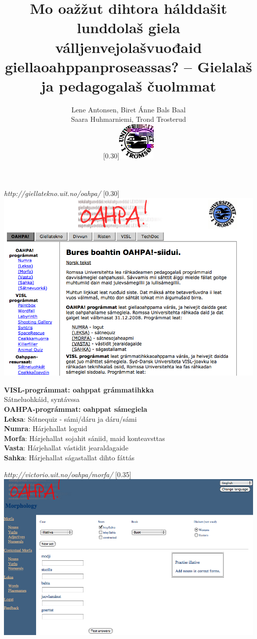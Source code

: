 \documentclass[landscape,norsk,11pt]{seminar}
\title{Mo oažžut dihtora hálddašit lunddolaš giela válljenvejolašvuođaid giellaoahppanproseassas? -- Gielalaš ja pedagogalaš čuolmmat}
\author{Lene Antonsen, Biret Ánne Bals Baal\\
Saara Huhmarniemi, Trond Trosterud \\
 \scalebox{0.30}[0.30]{\includegraphics{img/logoWeb070sh.jpg}}}
\begin{document}
\begin{slide}

\maketitle


\newslide
\textit{http://giellatekno.uit.no/oahpa/}
\scalebox{0.30}[0.30]{\includegraphics{img/gtoahpa.png}} 


\newslide
\textbf{VISL-prográmmat: oahppat grámmatihkka}\\
\newline
Sátneluohkáid, syntávssa\\


\newslide
\textbf{OAHPA-prográmmat: oahppat sámegiela}\\
\newline
\textbf{Leksa}: Sátnequiz - sámi/dáru ja dáru/sámi\\
\textbf{Numra}: Hárjehallat loguid\\
\textbf{Morfa}: Hárjehallat sojahit sániid, maid konteavsttas \\
\textbf{Vasta}: Hárjehallat vástidit jearaldagaide \\
\textbf{Sahka}: Hárjehallat ságastallat dihto fáttás

\newslide
\textit{http://victorio.uit.no/oahpa/morfa/}
\scalebox{0.35}[0.35]{\includegraphics{img/oahpa.png}} 


\end{slide}
\end{document}
